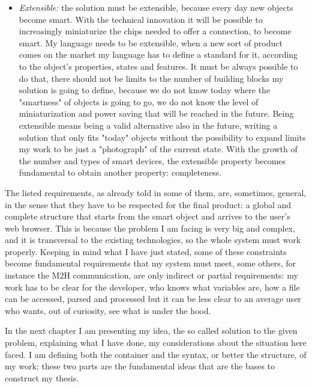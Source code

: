 \begin{itemize}
	\item \textit{Extensible:} the solution must be extensible, because every day new objects become smart. With the technical innovation it will be possible to increasingly miniaturize the chips needed to offer a connection, to become smart. My language needs to be extensible, when a new sort of product comes on the market my language has to define a standard for it, according to the object's properties, states and features. It must be always possible to do that, there should not be limits to the number of building blocks my solution is going to define, because we do not know today where the "smartness" of objects is going to go, we do not know the level of miniaturization and power saving that will be reached in the future. Being extensible means being a valid alternative also in the future, writing a solution that only fits "today" objects without the possibility to expand limits my work to be just a "photograph" of the current state. With the growth of the number and types of smart devices, the extensible property becomes fundamental to obtain another property: completeness.
	
\end{itemize}
 
The listed requirements, as already told in some of them, are, sometimes, general, in the sense that they have to be respected for the final product: a global and complete structure that starts from the smart object and arrives to the user's web browser. This is because the problem I am facing is very big and complex, and it is transversal to the existing technologies, so the whole system must work properly. Keeping in mind what I have just stated, some of these constraints become fundamental requirements that my system must meet, some others, for instance the M2H communication, are only indirect or partial requirements: my work has to be clear for the developer, who knows what variables are, how a file can be accessed, parsed and processed but it can be less clear to an average user who wants, out of curiosity, see what is under the hood.

\bigskip
\bigskip
\bigskip

In the next chapter I am presenting my idea, the so called solution to the given problem, explaining what I have done, my considerations about the situation here faced. I am defining both the container and the syntax, or better the structure, of my work; these two parts are the fundamental ideas that are the bases to construct my thesis. 


%
